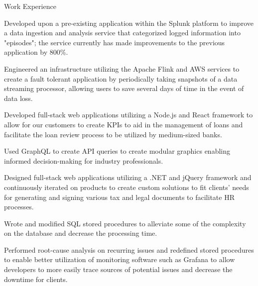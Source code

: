 \documentclass{resume} %
\begin{document}
\begin{workSection}{Work Experience}
    \experienceItem[
        company=Splunk,
        location=San Jose{,} CA,
        position=Backend Software Engineer Intern,
        duration=May 2023 - July 2023
    ]
     \begin{bullets}
        \item Developed upon a pre-existing application within the Splunk platform to improve a data ingestion and analysis service that categorized logged information into "episodes"; the service currently has made improvements to the previous application by 800\%.
        \item Engineered an infrastructure utilizing the Apache Flink and AWS services to create a fault tolerant application by periodically taking snapshots of a data streaming processor, allowing users to save several days of time in the event of data loss.
     \end{bullets}
     
    \experienceItem[
        company=QwickRate,
        location=Marietta{,} GA (Remote),
        position=Software Engineer Intern,
        duration=August 2022 - April 2023
    ]
    \begin{bullets}
        \item Developed full-stack web applications utilizing a Node.js and React framework to allow for our customers to create KPIs to aid in the management of loans and facilitate the loan review process to be utilized by medium-sized banks.
        \item Used GraphQL to create API queries to create modular graphics enabling informed decision-making for industry professionals.
     \end{bullets}

     \experienceItem[
        company=Ultimate Kronos Group (UKG),
        location=Atlanta{,} GA,
        position=Full-stack Software Engineer Intern,
        duration=January 2022 - August 2022,
     ]
     \begin{bullets}
        \item Designed full-stack web applications utilizing a .NET and jQuery framework and continuously iterated on products to create custom solutions to fit clients’ needs for generating and signing various tax and legal documents to facilitate HR processes.
        \item Wrote and modified SQL stored procedures to alleviate some of the complexity on the database and decrease the processing time.
        \item Performed root-cause analysis on recurring issues and redefined stored procedures to enable better utilization of monitoring software such as Grafana to allow developers to more easily trace sources of potential issues and decrease the downtime for clients.
     \end{bullets}
     
\end{workSection}
\end{document}
